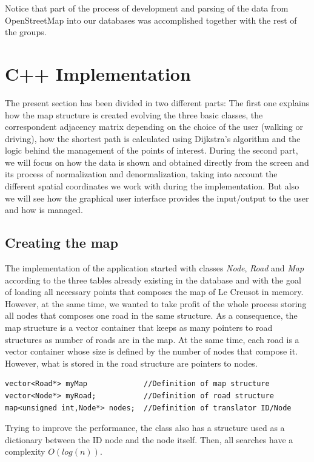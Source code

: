 \documentclass{article}
\begin{document}
Notice that part of the process of development and parsing of the data from OpenStreetMap into our databases was accomplished together with the rest of the groups.

\section{C++ Implementation}

The present section has been divided in two different parts: The first one explains how the map structure is created evolving the three basic classes, the correspondent adjacency matrix depending on the choice of the user (walking or driving), how the shortest path is calculated using Dijkstra's algorithm and the logic behind the management of the points of interest. During the second part, we will focus on how the data is shown and obtained directly from the screen and its process of normalization and denormalization, taking into account the different spatial coordinates we work with during the implementation. But also we will see how the graphical user interface provides the input/output to the user and how is managed.

\subsection{Creating the map}
The implementation of the application started with classes \textit{Node}, \textit{Road} and \textit{Map} according to the three tables already existing in the database and with the goal of loading all necessary points that composes the map of Le Creusot in memory. However, at the same time, we wanted to take profit of the whole process storing all nodes that composes one road in the same structure. As a consequence, the map structure is a vector container that keeps as many pointers to road structures as number of roads are in the map. At the same time, each road is a vector container whose size is defined by the number of nodes that compose it. However, what is stored in the road structure are pointers to nodes.

\begin{lstlisting}
vector<Road*> myMap 			//Definition of map structure
vector<Node*> myRoad;			//Definition of road structure
map<unsigned int,Node*> nodes;	//Definition of translator ID/Node
\end{lstlisting}

Trying to improve the performance, the class also has a structure used as a dictionary between the ID node and the node itself. Then, all searches have a complexity $ O(log(n)) $.
\end{document}
